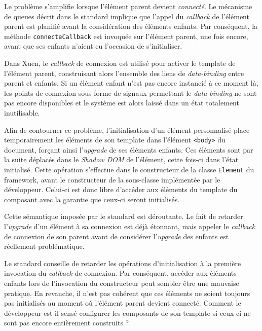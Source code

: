 Le problème s'amplifie lorsque l'élément parent devient \emph{connecté}. Le mécanisme de queues décrit dans le standard implique que l'appel du \emph{callback} de l'élément parent est planifié avant la considération des éléments enfants. Par conséquent, la méthode \texttt{connecteCallback} est invoquée sur l'élément parent, une fois encore, avant que ses enfants n'aient eu l'occasion de s'initialiser.

Dans Xuen, le \emph{callback} de connexion est utilisé pour activer le template de l'élément parent, construisant alors l'ensemble des liens de \emph{data-binding} entre parent et enfants. Si un élément enfant n'est pas encore instancié à ce moment là, les points de connexion sous forme de signaux permettant le \emph{data-binding} ne sont pas encore disponibles et le système est alors laissé dans un état totalement inutilisable.

Afin de contourner ce problème, l'initialisation d'un élément personnalisé place temporairement les éléments de son template dans l'élément \texttt{<body>} du document, forçant ainsi l'\emph{upgrade} de ses éléments enfants. Ces éléments sont par la suite déplacés dans le \emph{Shadow DOM} de l'élément, cette fois-ci dans l'état initialisé. Cette opération s'effectue dans le constructeur de la classe \texttt{Element} du framework, avant le constructeur de la sous-classe implémentée par le développeur. Celui-ci est donc libre d'accéder aux éléments du template du composant avec la garantie que ceux-ci seront initialisés.

Cette sémantique imposée par le standard est déroutante. Le fait de retarder l'\emph{upgrade} d'un élément à sa connexion est déjà étonnant, mais appeler le \emph{callback} de connexion de son parent avant de considérer l'\emph{upgrade} des enfants est réellement problématique.

Le standard conseille de retarder les opérations d'initialisation à la première invocation du \emph{callback} de connexion. Par conséquent, accéder aux éléments enfants lors de l'invocation du constructeur peut sembler être une mauvaise pratique. En revanche, il n'est pas cohérent que ces éléments ne soient toujours pas initialisés au moment où l'élément parent devient connecté. Comment le développeur est-il sensé configurer les composants de son template si ceux-ci ne sont pas encore entièrement construits ?
